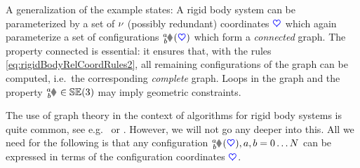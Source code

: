 A generalization of the example states:
A rigid body system can be parameterized by a set of $\nu$ (possibly redundant) coordinates $\boldsymbol{\textcolor{blue}{\heartsuit}}$ which again parameterize a set of configurations $\bodyHomoCoord{\BidxI}{\BidxII}(\sysCoord)$ which form a \textit{connected} graph.
The property connected is essential: it ensures that, with the rules \eqref{eq:rigidBodyRelCoordRules2}, all remaining configurations of the graph can be computed, i.e.\ the corresponding \textit{complete} graph.
Loops in the graph and the property $\bodyHomoCoord{\BidxI}{\BidxII} \in \SpecialEuclideanGroup(3)$ may imply geometric constraints.

The use of graph theory in the context of algorithms for rigid body systems is quite common, see e.g.\ \cite[sec.\,8.2]{Schwertassek:MultibodySystems} or \cite[sec.\,5.3]{Wittenburg:DynamicsOfMultibodySystems}.
However, we will not go any deeper into this.
All we need for the following is that any configuration $\bodyHomoCoord{\BidxI}{\BidxII}(\sysCoord), \BidxI,\BidxII = 0\ldots\numRigidBodies$ can be expressed in terms of the configuration coordinates $\boldsymbol{\textcolor{blue}{\heartsuit}}$.

